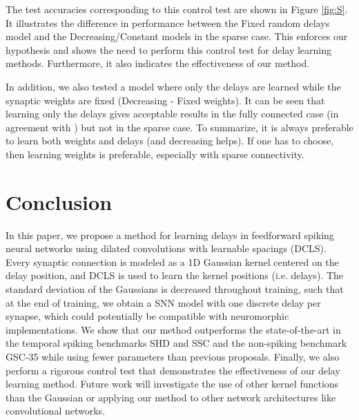 \documentclass{article} \usepackage{iclr2024_conference,times}
\begin{document}
The test accuracies corresponding to this control test are shown in Figure \ref{fig:S}. It illustrates the difference in performance between the Fixed random delays model and the Decreasing/Constant  models in the sparse case. This enforces our hypothesis and shows the need to perform this control test for delay learning methods. Furthermore, it also indicates the effectiveness of our method.

In addition, we also tested a model where only the delays are learned while the synaptic weights are fixed (Decreasing  - Fixed weights). It can be seen that learning only the delays gives acceptable results in the fully connected case (in agreement with \citet{beyondweights}) but not in the sparse case. To summarize, it is always preferable to learn both weights and delays (and decreasing  helps). If one has to choose, then learning weights is preferable, especially with sparse connectivity.












\section{Conclusion}



In this paper, we propose a method for learning delays in feedforward spiking neural networks using dilated convolutions with learnable spacings (DCLS). Every synaptic connection is modeled as a 1D Gaussian kernel centered on the delay position, and DCLS is used to learn the kernel positions (i.e. delays). The standard deviation of the Gaussians is decreased throughout training, such that at the end of training, we obtain a SNN model with one discrete delay per synapse, which could potentially be compatible with neuromorphic implementations. We show that our method outperforms the state-of-the-art in the temporal spiking benchmarks SHD and SSC and the non-spiking benchmark GSC-35 while using fewer parameters than previous proposals. Finally, we also perform a rigorous control test that demonstrates the effectiveness of our delay learning method. Future work will investigate the use of other kernel functions than the Gaussian or applying our method to other network architectures like convolutional networks.
\end{document}
